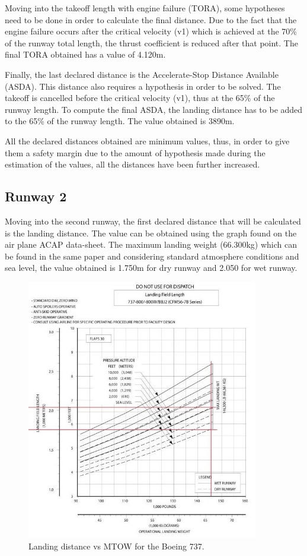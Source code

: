 		
		Moving into the takeoff length with engine failure (TORA), some hypotheses need to be done in order to calculate the final distance.  Due to the fact that the engine failure occurs after the critical velocity (v1) which is achieved at the 70\% of the runway total length, the thrust coefficient is reduced after that point. The final TORA obtained has a value of 4.120m.
		
		
		Finally, the last declared distance is the Accelerate-Stop Distance Available (ASDA). This distance also requires a hypothesis in order to be solved. The takeoff is cancelled before the critical velocity (v1), thus at the 65\% of the runway length. To compute the final ASDA, the landing distance has to be added to the 65\% of the runway length. The value obtained is 3890m.  
		
		All the declared distances obtained are minimum values, thus, in order to give them a safety margin due to the amount of hypothesis made during the estimation of the values, all the distances have been further increased. 
		
		\subsection{Runway 2}
		Moving into the second runway, the first declared distance that will be calculated is the landing distance. The value can be obtained using the graph found on the air plane ACAP data-sheet. The maximum landing weight (66.300kg) which can be found in the same paper and considering standard atmosphere conditions and sea level, the value obtained is 1.750m for dry runway and 2.050 for wet runway.
		
		\begin{figure}[H]
			\centering
			\includegraphics[clip, trim=0cm 0cm 0cm 0cm, width=0.9\textwidth]{./images/B737/landingdistance737}
			\caption{Landing distance vs MTOW for the Boeing 737.}
			\label{} %
		\end{figure}
	
